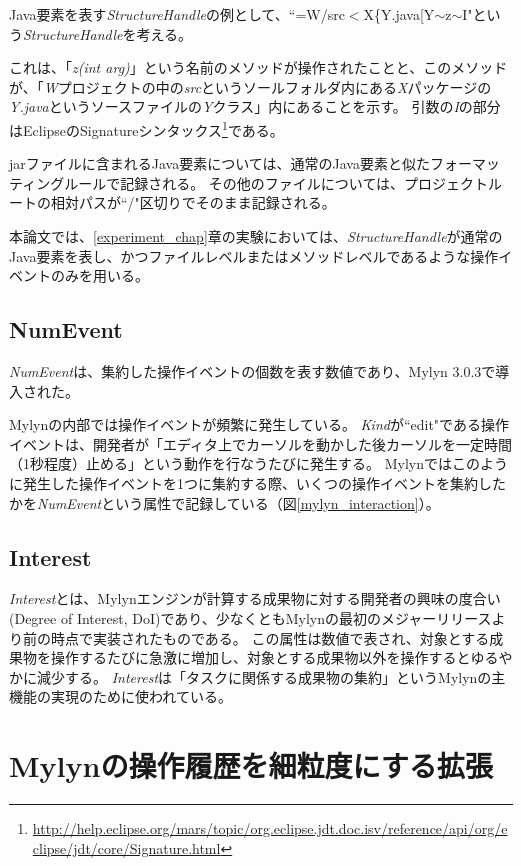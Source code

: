 \documentclass[a4paper]{jsbook}
\begin{document}
Java要素を表す{\it StructureHandle}の例として、``=W/src$<$X\{Y.java[Y$\sim$z$\sim$I"という{\it StructureHandle}を考える。

これは、「{\it z(int arg)}」という名前のメソッドが操作されたことと、このメソッドが、「{\it W}プロジェクトの中の{\it src}というソールフォルダ内にある{\it X}パッケージの{\it Y.java}というソースファイルの{\it Y}クラス」内にあることを示す。
引数の{\it I}の部分はEclipseのSignatureシンタックス\footnote{\url{http://help.eclipse.org/mars/topic/org.eclipse.jdt.doc.isv/reference/api/org/eclipse/jdt/core/Signature.html}}である。

jarファイルに含まれるJava要素については、通常のJava要素と似たフォーマッティングルールで記録される。
その他のファイルについては、プロジェクトルートの相対パスが``/"区切りでそのまま記録される。

本論文では、\ref{experiment_chap}章の実験においては、{\it StructureHandle}が通常のJava要素を表し、かつファイルレベルまたはメソッドレベルであるような操作イベントのみを用いる。

\section{NumEvent}
{\it NumEvent}は、集約した操作イベントの個数を表す数値であり、Mylyn 3.0.3で導入された。

Mylynの内部では操作イベントが頻繁に発生している。
{\it Kind}が``edit"である操作イベントは、開発者が「エディタ上でカーソルを動かした後カーソルを一定時間（1秒程度）止める」という動作を行なうたびに発生する。
Mylynではこのように発生した操作イベントを1つに集約する際、いくつの操作イベントを集約したかを{\it NumEvent}という属性で記録している（図\ref{mylyn_interaction}）。
\section{Interest}
{\it Interest}とは、Mylynエンジンが計算する成果物に対する開発者の興味の度合い(Degree of Interest, DoI)\cite{Kersten:2006}であり、少なくともMylynの最初のメジャーリリースより前の時点で実装されたものである。
この属性は数値で表され、対象とする成果物を操作するたびに急激に増加し、対象とする成果物以外を操作するとゆるやかに減少する。
{\it Interest}は「タスクに関係する成果物の集約」というMylynの主機能の実現のために使われている。

\chapter{Mylynの操作履歴を細粒度にする拡張}\label{mylynplus_chap}
\end{document}
